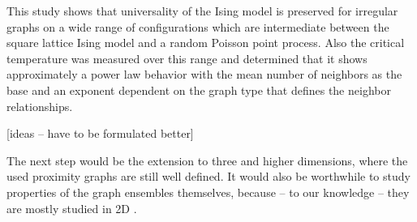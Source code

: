 \label{sec:conclusion}
This study shows that universality of the Ising model is preserved for
irregular graphs on a wide range of configurations which are intermediate
between the square lattice Ising model and a random Poisson point process.
Also the critical temperature was measured over this range and determined
that it shows approximately a power law behavior with the mean
number of neighbors as the base and an exponent dependent on the
graph type that defines the neighbor relationships.

[ideas -- have to be formulated better]

The next step would be the extension to three and higher
dimensions, where the used proximity graphs are still well defined. It
would also be worthwhile to study properties of the graph ensembles themselves,
because -- to our knowledge -- they are mostly studied in 2D \cite{RNGCell}.
